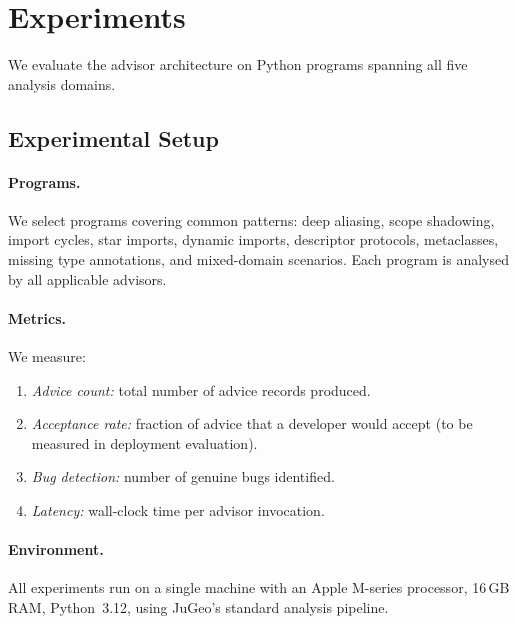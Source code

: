 \documentclass[11pt]{article}
\begin{document}
\section{Experiments}\label{sec:experiments}

We evaluate the advisor architecture on \ppXCprogramCount{} Python
programs spanning all five analysis domains.

\subsection{Experimental Setup}\label{sec:setup}

\paragraph{Programs.}
We select \ppXCprogramCount{} programs covering common patterns:
deep aliasing, scope shadowing, import cycles, star imports, dynamic
imports, descriptor protocols, metaclasses, missing type annotations,
and mixed-domain scenarios.  Each program is analysed by all applicable
advisors.

\paragraph{Metrics.}
We measure:
\begin{enumerate}
  \item \emph{Advice count:} total number of advice records produced.
  \item \emph{Acceptance rate:} fraction of advice that a developer
    would accept (to be measured in deployment evaluation).
  \item \emph{Bug detection:} number of genuine bugs identified.
  \item \emph{Latency:} wall-clock time per advisor invocation.
\end{enumerate}

\paragraph{Environment.}
All experiments run on a single machine with an Apple M-series
processor, 16\,GB RAM, Python~3.12, using JuGeo's standard analysis
pipeline.
\end{document}
